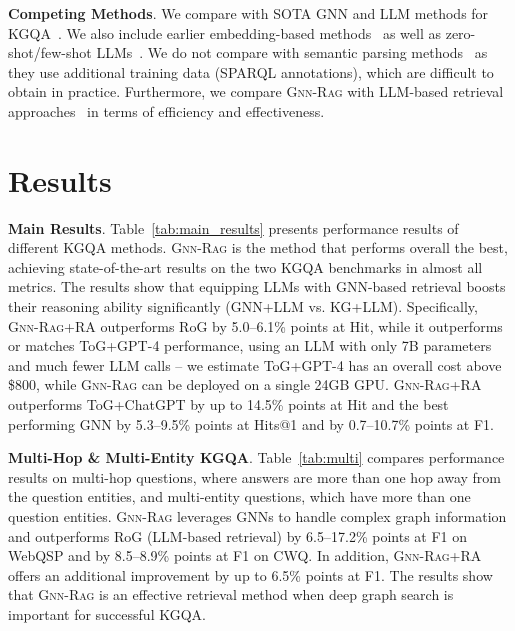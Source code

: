 \documentclass{article}
\newcommand{\grag}{\textsc{Gnn-Rag}\xspace}
\newcommand{\gragx}{\textsc{Gnn-Rag}}
\theoremstyle{plain}
\theoremstyle{definition}
\theoremstyle{remark}
\begin{document}



\textbf{Competing Methods}.  We compare with SOTA GNN and LLM methods for KGQA~\citep{mavromatis2022rearev,li2023binder}. We also include earlier embedding-based methods~\citep{saxena2020improving} as well as zero-shot/few-shot LLMs~\citep{alpaca2023}. We do not compare with semantic parsing methods~\citep{yu2022decaf} as they use additional training data (SPARQL annotations), which are difficult  to obtain in practice. Furthermore, we compare \grag with LLM-based retrieval approaches~\citep{luo2024rog,sun2024tog} in terms of efficiency and effectiveness. 


\section{Results}



\textbf{Main Results}.
Table~\ref{tab:main_results} presents performance results of different KGQA methods. \grag is the method that performs overall the best, achieving state-of-the-art results on the two KGQA benchmarks in almost all metrics. The results show that equipping LLMs with GNN-based retrieval boosts their reasoning ability significantly (GNN+LLM vs. KG+LLM). Specifically, \gragx+RA outperforms RoG by 5.0--6.1\% points at Hit, while it outperforms or matches ToG+GPT-4 performance, using an LLM with only 7B parameters and much fewer LLM calls -- we estimate ToG+GPT-4 has an overall cost above \$800, while \grag can be deployed on a single 24GB GPU. \gragx+RA outperforms ToG+ChatGPT by up to 14.5\% points at Hit and the best performing GNN by 5.3--9.5\% points at Hits@1 and by 0.7--10.7\% points at F1. 




\textbf{Multi-Hop \& Multi-Entity KGQA}. Table~\ref{tab:multi} compares performance results on multi-hop questions, where answers are more than one hop away from the question entities, and multi-entity questions, which have more than one question entities. \grag leverages GNNs to handle complex graph information and outperforms RoG (LLM-based retrieval) by 6.5--17.2\% points at F1 on WebQSP and by 8.5--8.9\% points at F1 on CWQ. In addition, \gragx+RA offers an additional improvement by up to 6.5\% points at F1. The results show that \grag is an effective retrieval method when deep graph search is important for successful KGQA. 


 
\end{document}
